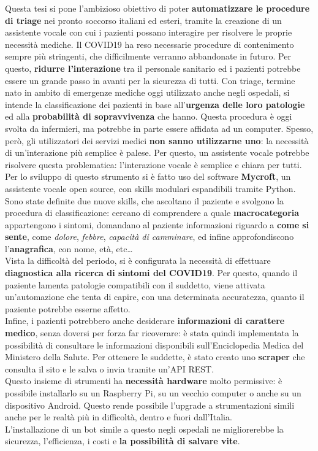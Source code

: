 \documentclass[trieste,corpo=11pt,numerazioneromana]{toptesi}
\begin{document}
\sommario
Questa tesi si pone l'ambizioso obiettivo di poter \textbf{automatizzare le procedure di triage} nei pronto soccorso italiani ed esteri, tramite la creazione di un assistente vocale con cui i pazienti possano interagire per risolvere le proprie necessità mediche. Il COVID19 ha reso necessarie procedure di contenimento sempre più stringenti, che difficilmente verranno abbandonate in futuro. Per questo, \textbf{ridurre l'interazione} tra il personale sanitario ed i pazienti potrebbe essere un grande passo in avanti per la sicurezza di tutti. Con triage, termine nato in ambito di emergenze mediche oggi utilizzato anche negli ospedali, si intende la classificazione dei pazienti in base all'\textbf{urgenza delle loro patologie} ed alla \textbf{probabilità di sopravvivenza} che hanno. Questa procedura è oggi svolta da infermieri, ma potrebbe in parte essere affidata ad un computer. Spesso, però, gli utilizzatori dei servizi medici \textbf{non sanno utilizzarne uno}: la necessità di un'interazione più semplice è palese. Per questo, un assistente vocale potrebbe risolvere questa problematica: l'interazione vocale è semplice e chiara per tutti.\\
Per lo sviluppo di questo strumento si è fatto uso del software \textbf{Mycroft}, un assistente vocale open source, con skills modulari espandibili tramite Python. Sono state definite due nuove skills, che ascoltano il paziente e svolgono la procedura di classificazione: cercano di comprendere a quale \textbf{macrocategoria} appartengono i sintomi, domandano al paziente informazioni riguardo a \textbf{come si sente}, come \textit{dolore}, \textit{febbre}, \textit{capacità di camminare}, ed infine approfondiscono l'\textbf{anagrafica}, con nome, età, etc\dots\\
Vista la difficoltà del periodo, si è configurata la necessità di effettuare \textbf{diagnostica alla ricerca di sintomi del COVID19}. Per questo, quando il paziente lamenta patologie compatibili con il suddetto, viene attivata un'automazione che tenta di capire, con una determinata accuratezza, quanto il paziente potrebbe esserne affetto.\\
Infine, i pazienti potrebbero anche desiderare \textbf{informazioni di carattere medico}, senza doversi per forza far ricoverare: è stata quindi implementata la possibilità di consultare le informazioni disponibili sull'Enciclopedia Medica del Ministero della Salute. Per ottenere le suddette, è stato creato uno \textbf{scraper} che consulta il sito e le salva o invia tramite un'API REST.\\
Questo insieme di strumenti ha \textbf{necessità hardware} molto permissive: è possibile installarlo su un Raspberry Pi, su un vecchio computer o anche su un dispositivo Android. Questo rende possibile l'upgrade a strumentazioni simili anche per le realtà più in difficoltà, dentro e fuori dall'Italia.\\
L'installazione di un bot simile a questo negli ospedali ne migliorerebbe la sicurezza, l'efficienza, i costi e \textbf{la possibilità di salvare vite}.
\end{document}
